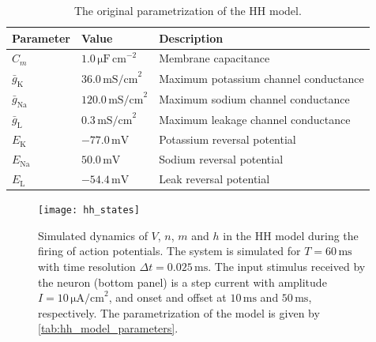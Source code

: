 \begin{table}[!htb]
  \caption{The original parametrization of the HH model.}
  \begin{center}
    \begin{tabular}{lll}
      \toprule
      \textbf{Parameter} & \textbf{Value} & \textbf{Description} \\
      \midrule
      $C_m$ & $1.0 \, \mathrm{\mu F \, cm}^{-2}$ & Membrane capacitance
      \\
      $\bar{g}_\mathrm{K}$ & $36.0 \,\mathrm{mS/cm}^2$ & Maximum potassium channel conductance 
      \\
      $\bar{g}_\mathrm{Na}$ & $120.0 \,\mathrm{mS/cm}^2$ & Maximum sodium channel conductance 
      \\
      $\bar{g}_\mathrm{L}$ & $0.3 \,\mathrm{mS/cm}^2$ & Maximum leakage channel conductance
      \\
      $E_\mathrm{K}$ & $-77.0 \,\mathrm{mV}$ & Potassium reversal potential
      \\
      $E_\mathrm{Na}$ & $50.0 \,\mathrm{mV}$ & Sodium reversal potential
      \\
      $E_\mathrm{L}$ & $-54.4 \,\mathrm{mV}$ & Leak reversal potential
      \\
      \bottomrule
    \end{tabular}
  \end{center}
  \label{tab:hh_model_parameters}
\end{table}

\begin{figure}[H]
    \centering
    \texttt{[image: hh\_states]}
    \caption{Simulated dynamics of $V$, $n$, $m$ and $h$ in the HH model during the firing of action potentials. The system is simulated for $T = 60 \,\mathrm{ms}$ with time resolution $\Delta t=0.025 \,\mathrm{ms}$. The input stimulus received by the neuron (bottom panel) is a step current with amplitude $I = 10 \, \mathrm{\mu A/cm}^2$, and onset and offset at $10 \,\mathrm{ms}$ and $50 \,\mathrm{ms}$, respectively. The parametrization of the model is given by \autoref{tab:hh_model_parameters}. 
    }
    \label{fig:hh_states}
\end{figure}